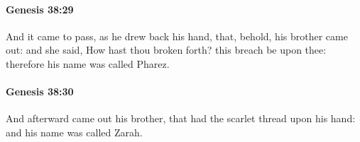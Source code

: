 		\paragraph{Genesis 38:29} %
			\label{GENESIS-38-29}

			And it came to pass, as he drew back his hand, that, behold, his brother came out: and she said, How hast thou broken forth? this breach be upon thee: therefore his name was called Pharez.


		\paragraph{Genesis 38:30} %
			\label{GENESIS-38-30}

			And afterward came out his brother, that had the scarlet thread upon his hand: and his name was called Zarah.

